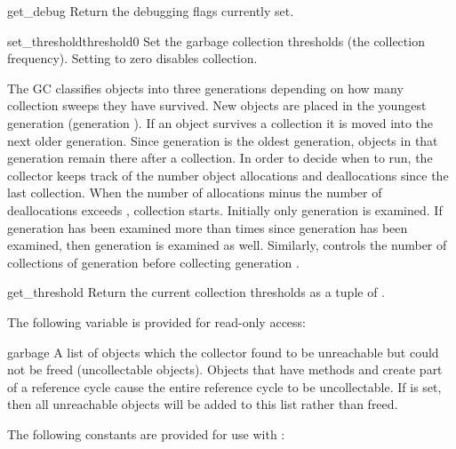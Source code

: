 \begin{funcdesc}{get_debug}{}
Return the debugging flags currently set.
\end{funcdesc}

\begin{funcdesc}{set_threshold}{threshold0}
Set the garbage collection thresholds (the collection frequency).
Setting  to zero disables collection.

The GC classifies objects into three generations depending on how many
collection sweeps they have survived.  New objects are placed in the
youngest generation (generation ).  If an object survives a
collection it is moved into the next older generation.  Since
generation  is the oldest generation, objects in that
generation remain there after a collection.  In order to decide when
to run, the collector keeps track of the number object allocations and
deallocations since the last collection.  When the number of
allocations minus the number of deallocations exceeds
, collection starts.  Initially only generation
 is examined.  If generation  has been examined more
than  times since generation  has been
examined, then generation  is examined as well.  Similarly,
 controls the number of collections of generation
 before collecting generation .
\end{funcdesc}

\begin{funcdesc}{get_threshold}{}
Return the current collection thresholds as a tuple of
.
\end{funcdesc}


The following variable is provided for read-only access:

\begin{datadesc}{garbage}
A list of objects which the collector found to be unreachable
but could not be freed (uncollectable objects).  Objects that have
 methods and create part of a reference cycle cause
the entire reference cycle to be uncollectable.  If
 is set, then all unreachable objects will
be added to this list rather than freed.
\end{datadesc}


The following constants are provided for use with
:

